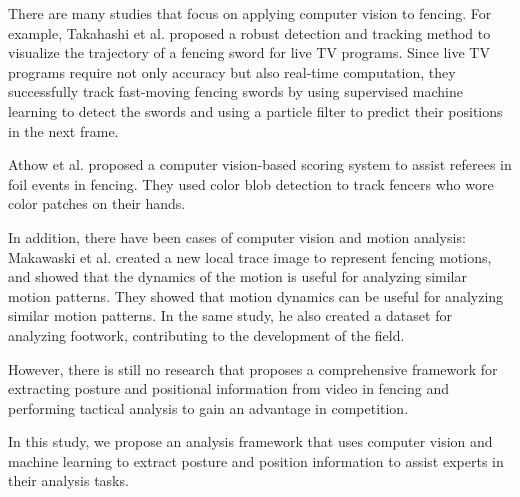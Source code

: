 There are many studies that focus on applying computer vision to fencing. For example, Takahashi\cite{takahashi2020real} et al. proposed a robust detection and tracking method to visualize the trajectory of a fencing sword for live TV programs. Since live TV programs require not only accuracy but also real-time computation, they successfully track fast-moving fencing swords by using supervised machine learning to detect the swords and using a particle filter to predict their positions in the next frame.

Athow\cite{athowusing} et al. proposed a computer vision-based scoring system to assist referees in foil events in fencing. They used color blob detection to track fencers who wore color patches on their hands.

In addition, there have been cases of computer vision and motion analysis: Makawaski et al. \cite{MALAWSKI20181} created a new local trace image to represent fencing motions, and showed that the dynamics of the motion is useful for analyzing similar motion patterns. They showed that motion dynamics can be useful for analyzing similar motion patterns. In the same study, he also created a dataset for analyzing footwork, contributing to the development of the field.

However, there is still no research that proposes a comprehensive framework for extracting posture and positional information from video in fencing and performing tactical analysis to gain an advantage in competition.

In this study, we propose an analysis framework that uses computer vision and machine learning to extract posture and position information to assist experts in their analysis tasks.

